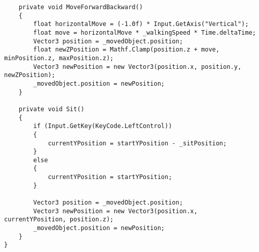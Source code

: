 \begin{verbatim}
    private void MoveForwardBackward()
    {
        float horizontalMove = (-1.0f) * Input.GetAxis("Vertical");
        float move = horizontalMove * _walkingSpeed * Time.deltaTime;
        Vector3 position = _movedObject.position;
        float newZPosition = Mathf.Clamp(position.z + move, minPosition.z, maxPosition.z);
        Vector3 newPosition = new Vector3(position.x, position.y, newZPosition);
        _movedObject.position = newPosition;
    }

    private void Sit()
    {
        if (Input.GetKey(KeyCode.LeftControl))
        {
            currentYPosition = startYPosition - _sitPosition;
        }
        else
        {
            currentYPosition = startYPosition;
        }

        Vector3 position = _movedObject.position;
        Vector3 newPosition = new Vector3(position.x, currentYPosition, position.z);
        _movedObject.position = newPosition;
    }
}
\end{verbatim}
